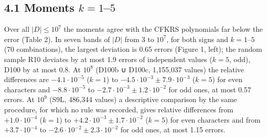 \documentclass[
  10pt,
]{article}
\begin{document}
\hypertarget{moments-k-15}{%
\subsection{\texorpdfstring{4.1 Moments
\(k = 1\)--\(5\)}{4.1 Moments k = 1--5}}\label{moments-k-15}}

Over all \(|D| \le 10^7\) the moments agree with the CFKRS polynomials
far below the error (Table 2). In seven bands of \(|D|\) from \(3\) to
\(10^7\), for both signs and \(k = 1\)--\(5\) (70 combinations), the
largest deviation is 0.65 errors (Figure 1, left); the random sample R10
deviates by at most 1.9 errors of independent values (\(k = 5\), odd),
D100 by at most 0.8. At \(10^8\) (D100b ∪ D100c, 1,155,037 values) the
relative differences are \(-4.1\cdot10^{-5}\) (\(k = 1\)) to
\(-4.5\cdot10^{-3} \pm 7.9\cdot10^{-3}\) (\(k = 5\)) for even characters
and \(-8.8\cdot10^{-5}\) to \(-2.7\cdot10^{-3} \pm 1.2\cdot10^{-2}\) for
odd ones, at most 0.57 errors. At \(10^9\) (S9L, 486,344 values) a
descriptive comparison by the same procedure, for which no rule was
recorded, gives relative differences from \(+1.0\cdot10^{-4}\)
(\(k = 1\)) to \(+4.2\cdot10^{-3} \pm 1.7\cdot10^{-2}\) (\(k = 5\)) for
even characters and from \(+3.7\cdot10^{-4}\) to
\(-2.6\cdot10^{-2} \pm 2.3\cdot10^{-2}\) for odd ones, at most 1.15
errors.
\end{document}
